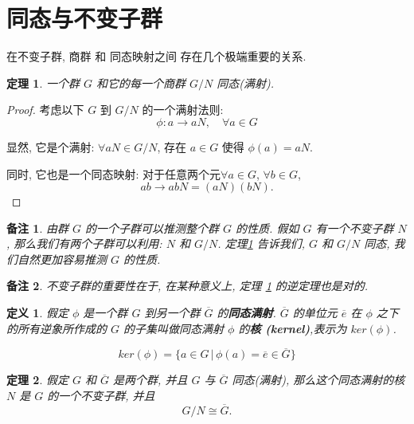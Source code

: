 \documentclass[utf8]{ctexbook}
\newtheorem{theorem}{定理}[section]
\newtheorem{definition}{定义}[section]
\newtheorem{memo}{备注}[section]
\begin{document}
\section{同态与不变子群}

在不变子群, 商群 和 同态映射之间 存在几个极端重要的关系.

\begin{theorem}\label{thm_group_quotient_group}
一个群 $G$ 和它的每一个商群 $G/N$ 同态(满射).
\end{theorem}

\begin{proof}
考虑以下 $G$ 到 $G/N$ 的一个满射法则:
$$ \phi: a \longrightarrow aN, \quad \forall a \in G $$

显然, 它是个满射: $\forall aN \in G/N$, 存在 $a \in G$ 使得 $\phi(a) = aN$.

同时, 它也是一个同态映射: 对于任意两个元$\forall a \in G$, $\forall b \in G$, 
$$ ab \longrightarrow ab N = (aN) (bN) .$$

\end{proof}

\begin{memo}
由群 $G$ 的一个子群可以推测整个群 $G$ 的性质. 假如 $G$ 有一个不变子群 $N$, 那么我们有两个子群可以利用: $N$ 和 $G/N$. 定理\ref{thm_group_quotient_group} 告诉我们, $G$ 和 $G/N$ 同态, 我们自然更加容易推测 $G$ 的性质.
\end{memo}

\begin{memo}
不变子群的重要性在于, 在某种意义上, 定理 \ref{thm_group_quotient_group} 的逆定理也是对的.
\end{memo}

\begin{definition}
假定 $\phi$ 是一个群 $G$ 到另一个群 $\overline{G}$ 的\textbf{同态满射}. $\overline{G}$ 的单位元 $\overline{e}$ 在 $\phi$ 之下的所有逆象所作成的 $G$ 的子集叫做同态满射 $\phi$ 的\textbf{核 (kernel)},表示为 $ker(\phi)$.

\begin{equation}
ker(\phi) = \{ a \in G \, | \, \phi(a) = \overline{e} \in \overline{G} \}
\end{equation}
\end{definition}

\begin{theorem}\label{thm_group_quotient_group_inv}
假定 $G$ 和 $\overline{G}$ 是两个群, 并且 $G$ 与 $\overline{G}$ 同态(满射), 那么这个同态满射的核 $N$ 是 $G$ 的一个不变子群, 并且
$$ G/N \cong \overline{G} . $$
\end{theorem}
\end{document}
